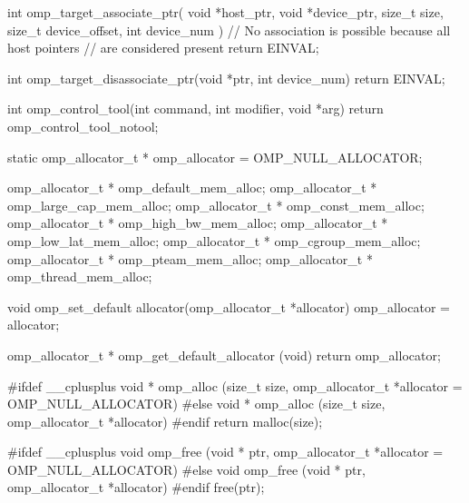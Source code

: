 {\begin{ompcFunction}
int omp_target_associate_ptr(
  void *host_ptr,
  void *device_ptr,
  size_t size,
  size_t device_offset,
  int device_num
)
{
  // No association is possible because all host pointers
  // are considered present
  return EINVAL;
}

int omp_target_disassociate_ptr(void *ptr, int device_num)
{
  return EINVAL;
}


int omp_control_tool(int command, int modifier, void *arg)
{
  return omp_control_tool_notool;
}

static omp_allocator_t * omp_allocator = OMP_NULL_ALLOCATOR;

omp_allocator_t * omp_default_mem_alloc;
omp_allocator_t * omp_large_cap_mem_alloc;
omp_allocator_t * omp_const_mem_alloc;
omp_allocator_t * omp_high_bw_mem_alloc;
omp_allocator_t * omp_low_lat_mem_alloc;
omp_allocator_t * omp_cgroup_mem_alloc;
omp_allocator_t * omp_pteam_mem_alloc;
omp_allocator_t * omp_thread_mem_alloc;

void omp_set_default allocator(omp_allocator_t *allocator)
{
  omp_allocator = allocator;
}

omp_allocator_t * omp_get_default_allocator (void)
{
  return omp_allocator;
}

#ifdef __cplusplus
void * omp_alloc (size_t size, omp_allocator_t *allocator = OMP_NULL_ALLOCATOR)
#else
void * omp_alloc (size_t size, omp_allocator_t *allocator)
#endif
{
  return malloc(size);
}

#ifdef __cplusplus
void omp_free (void * ptr, omp_allocator_t *allocator = OMP_NULL_ALLOCATOR)
#else
void omp_free (void * ptr, omp_allocator_t *allocator)
#endif
{
  free(ptr);
}

\end{ompcFunction}} %

